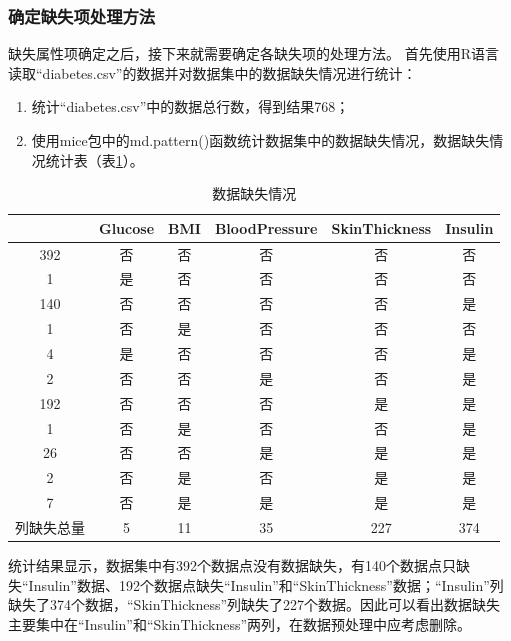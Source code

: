 \documentclass[a4paper]{ctexart}
\begin{document}
\subsubsection{确定缺失项处理方法}\label{sec:确定缺失项处理方法}
缺失属性项确定之后，接下来就需要确定各缺失项的处理方法。
首先使用R语言读取“diabetes.csv”的数据并对数据集中的数据缺失情况进行统计：
\begin{enumerate}
	\item 统计“diabetes.csv”中的数据总行数，得到结果768；
	\item 使用mice包中的md.pattern()函数统计数据集中的数据缺失情况，数据缺失情况统计表（表\ref{tab:缺失数据统计}）。
\end{enumerate}
\begin{table}[htbp]
	\centering
	\caption{数据缺失情况}
	\begin{tabular}{|c|ccccc|}
		\hline
		\diagbox{数据点数量}{是否缺失}{列名} & Glucose & BMI & BloodPressure & SkinThickness & Insulin \\\hline
		392                                  & 否      & 否  & 否            & 否            & 否      \\
		1                                    & 是      & 否  & 否            & 否            & 否      \\
		140                                  & 否      & 否  & 否            & 否            & 是      \\
		1                                    & 否      & 是  & 否            & 否            & 否      \\
		4                                    & 是      & 否  & 否            & 否            & 是      \\
		2                                    & 否      & 否  & 是            & 否            & 是      \\
		192                                  & 否      & 否  & 否            & 是            & 是      \\
		1                                    & 否      & 是  & 否            & 否            & 是      \\
		26                                   & 否      & 否  & 是            & 是            & 是      \\
		2                                    & 否      & 是  & 否            & 是            & 是      \\
		7                                    & 否      & 是  & 是            & 是            & 是      \\\hline
		列缺失总量                           & 5       & 11  & 35            & 227           & 374     \\\hline
	\end{tabular}
	\label{tab:缺失数据统计}
\end{table}
统计结果显示，数据集中有392个数据点没有数据缺失，有140个数据点只缺失“Insulin”数据、192个数据点缺失“Insulin”和“SkinThickness”数据；“Insulin”列缺失了374个数据，“SkinThickness”列缺失了227个数据。因此可以看出数据缺失主要集中在“Insulin”和“SkinThickness”两列，在数据预处理中应考虑删除。
\end{document}
